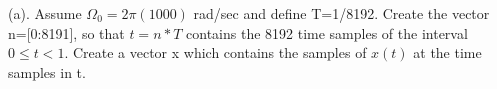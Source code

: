 (a). Assume $\Omega_0 = 2\pi(1000)$ rad/sec and define T=1/8192. Create the vector n=[0:8191], so that $t=n*T$ contains the 8192 time samples of the interval $0 \le t < 1$. Create a vector x which contains the samples of $x(t)$ at the time samples in t.
